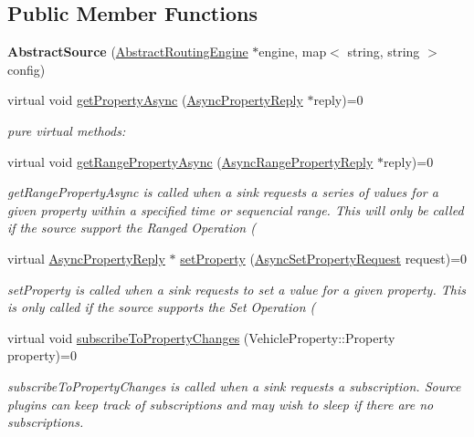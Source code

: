 \subsection*{Public Member Functions}
\begin{DoxyCompactItemize}
\item 
\hypertarget{classAbstractSource_a753c78f3ee4c565c4ba2157c06cb7fbe}{{\bfseries Abstract\-Source} (\hyperlink{classAbstractRoutingEngine}{Abstract\-Routing\-Engine} $\ast$engine, map$<$ string, string $>$ config)}\label{classAbstractSource_a753c78f3ee4c565c4ba2157c06cb7fbe}

\item 
virtual void \hyperlink{classAbstractSource_a05589e699ea16a14675db226d51bdf9f}{get\-Property\-Async} (\hyperlink{classAsyncPropertyReply}{Async\-Property\-Reply} $\ast$reply)=0
\begin{DoxyCompactList}\small\item\em pure virtual methods\-: \end{DoxyCompactList}\item 
virtual void \hyperlink{classAbstractSource_a3b30f939d68889b2540f6035fa5be7c7}{get\-Range\-Property\-Async} (\hyperlink{classAsyncRangePropertyReply}{Async\-Range\-Property\-Reply} $\ast$reply)=0
\begin{DoxyCompactList}\small\item\em get\-Range\-Property\-Async is called when a sink requests a series of values for a given property within a specified time or sequencial range. This will only be called if the source support the Ranged Operation ( \end{DoxyCompactList}\item 
virtual \hyperlink{classAsyncPropertyReply}{Async\-Property\-Reply} $\ast$ \hyperlink{classAbstractSource_a684b58112b5572dfe8cb94380bf7d74a}{set\-Property} (\hyperlink{classAsyncSetPropertyRequest}{Async\-Set\-Property\-Request} request)=0
\begin{DoxyCompactList}\small\item\em set\-Property is called when a sink requests to set a value for a given property. This is only called if the source supports the Set Operation ( \end{DoxyCompactList}\item 
virtual void \hyperlink{classAbstractSource_ae9c042e159f080c298b2ae37c47618e9}{subscribe\-To\-Property\-Changes} (Vehicle\-Property\-::\-Property property)=0
\begin{DoxyCompactList}\small\item\em subscribe\-To\-Property\-Changes is called when a sink requests a subscription. Source plugins can keep track of subscriptions and may wish to sleep if there are no subscriptions. \end{DoxyCompactList}\item 

\end{DoxyCompactItemize}

